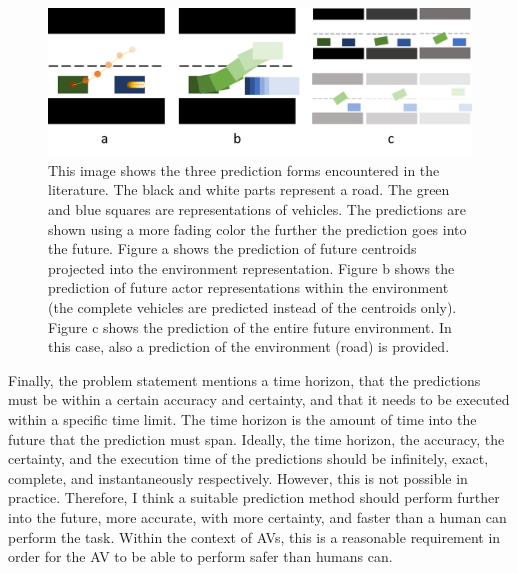 \begin{figure}[h!]
	\centering
	\includegraphics[width=0.8\linewidth]{Figures/Introduction/Prediction_forms}
	\caption{This image shows the three prediction forms encountered in the literature. The black and white parts represent a road. The green and blue squares are representations of vehicles. The predictions are shown using a more fading color the further the prediction goes into the future. Figure a shows the prediction of future centroids projected into the environment representation. Figure b shows the prediction of future actor representations within the environment (the complete vehicles are predicted instead of the centroids only). Figure c shows the prediction of the entire future environment. In this case, also a prediction of the environment (road) is provided.}  
	\label{fig:pred_froms}
\end{figure}

Finally, the problem statement mentions a time horizon, that the predictions must be within a certain accuracy and certainty, and that it needs to be executed within a specific time limit. The time horizon is the amount of time into the future that the prediction must span. Ideally, the time horizon, the accuracy, the certainty, and the execution time of the predictions should be infinitely, exact, complete, and instantaneously respectively. However, this is not possible in practice. Therefore, I think a suitable prediction method should perform further into the future, more accurate, with more certainty, and faster than a human can perform the task. Within the context of \glspl{AV}, this is a reasonable requirement in order for the \gls{AV} to be able to perform safer than humans can.   




